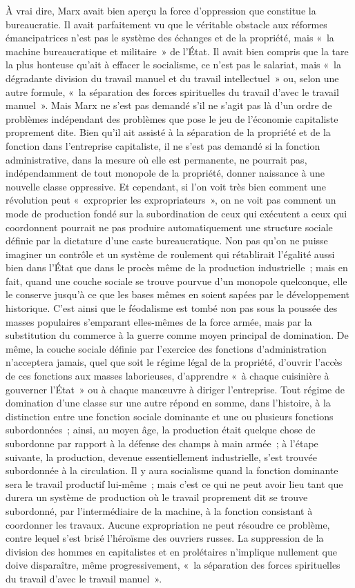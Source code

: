 \documentclass[french,twoside]{book} %
\begin{document}
À vrai dire, Marx avait bien aperçu la force d'oppression que constitue la bureaucratie. Il avait parfaitement vu que le véritable obstacle aux réformes émancipatrices n'est pas le système des échanges et de la propriété, mais « la machine bureaucratique et militaire » de l'État. Il avait bien compris que la tare la plus honteuse qu'ait à effacer le socialisme, ce n'est pas le salariat, mais « la dégradante division du travail manuel et du travail intellectuel » ou, selon une autre formule, « la séparation des forces spirituelles du travail d'avec le travail manuel ». Mais Marx ne s'est pas demandé s'il ne s'agit pas là d'un ordre de problèmes indépendant des problèmes que pose le jeu de l'économie capitaliste proprement dite. Bien qu'il ait assisté à la séparation de la propriété et de la fonction dans l'entreprise capitaliste, il ne s'est pas demandé si la fonction administrative, dans la mesure où elle est permanente, ne pourrait pas, indépendamment de tout monopole de la propriété, donner naissance à une nouvelle classe oppressive. Et cependant, si l'on voit très bien comment une révolution peut « exproprier les expropriateurs », on ne voit pas comment un mode de production fondé sur la subordination de ceux qui exécutent a ceux qui coordonnent pourrait ne pas produire automatiquement une structure sociale définie par la dictature d'une caste bureaucratique. Non pas qu'on ne puisse imaginer un contrôle et un système de roulement qui rétablirait l'égalité aussi bien dans l'État que dans le procès même de la production industrielle ; mais en fait, quand une couche sociale se trouve pourvue d'un monopole quelconque, elle le conserve jusqu'à ce que les bases mêmes en soient sapées par le développement historique. C'est ainsi que le féodalisme est tombé non pas sous la poussée des masses populaires s'emparant elles-mêmes de la force armée, mais par la substitution du commerce à la guerre comme moyen principal de domination. De même, la couche sociale définie par l'exercice des fonctions d'administration n'acceptera jamais, quel que soit le régime légal de la propriété, d'ouvrir l'accès de ces fonctions aux masses laborieuses, d'apprendre « à chaque cuisinière à gouverner l'État » ou à chaque manœuvre à diriger l'entreprise. Tout régime de domination d'une classe sur une autre répond en somme, dans l'histoire, à la distinction entre une fonction sociale dominante et une ou plusieurs fonctions subordonnées ; ainsi, au moyen âge, la production était quelque chose de subordonne par rapport à la défense des champs à main armée ; à l'étape suivante, la production, devenue essentiellement industrielle, s'est trouvée subordonnée à la circulation. Il y aura socialisme quand la fonction dominante sera le travail productif lui-même ; mais c'est ce qui ne peut avoir lieu tant que durera un système de production où le travail proprement dit se trouve subordonné, par l'intermédiaire de la machine, à la fonction consistant à coordonner les travaux. Aucune expropriation ne peut résoudre ce problème, contre lequel s'est brisé l'héroïsme des ouvriers russes. La suppression de la division des hommes en capitalistes et en prolétaires n'implique nullement que doive disparaître, même progressivement, « la séparation des forces spirituelles du travail d'avec le travail manuel ».\par
\end{document}
